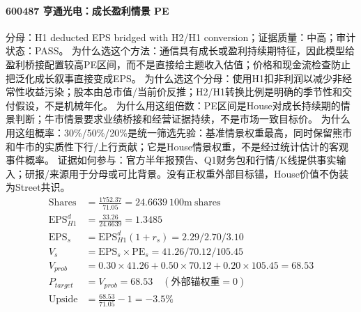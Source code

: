 \paragraph{600487 亨通光电：成长盈利情景 PE}
分母：H1 deducted EPS bridged with H2/H1 conversion；证据质量：中高；审计状态：PASS。
为什么选这个方法：通信具有成长或盈利持续期特征，因此模型给盈利桥接配置较高PE区间，而不是直接给主题收入估值；价格和现金流检查防止把泛化成长叙事直接变成EPS。
为什么选这个分母：使用H1扣非利润以减少非经常性收益污染；股本由总市值/当前价反推；H2/H1转换比例是明确的季节性和交付假设，不是机械年化。
为什么用这组倍数：PE区间是House对成长持续期的情景判断；牛市情景要求业绩桥接和经营证据持续，不是市场一致目标价。
为什么用这组概率：30\%/50\%/20\%是统一筛选先验：基准情景权重最高，同时保留熊市和牛市的实质性下行/上行贡献；它是House情景权重，不是经过统计估计的客观事件概率。
证据如何参与：官方半年报预告、Q1财务包和行情/K线提供事实输入；研报/来源用于分母或可比背景。没有正权重外部目标锚，House价值不伪装为Street共识。
\begin{align*}
\mathrm{Shares} &= \frac{1752.37}{71.05}=24.6639\ \mathrm{100m\ shares}\\
\mathrm{EPS}_{H1}^d &= \frac{33.26}{24.6639}=1.3485\\
\mathrm{EPS}_s &= \mathrm{EPS}_{H1}^d(1+r_s)=2.29/2.70/3.10\\
V_s &= \mathrm{EPS}_s\times \mathrm{PE}_s=41.26/70.12/105.45\\
V_{prob} &= 0.30\times 41.26+0.50\times 70.12+0.20\times 105.45=68.53\\
P_{target} &= V_{prob}=68.53\quad(\text{外部锚权重}=0)\\
\mathrm{Upside} &= \frac{68.53}{71.05}-1=-3.5\%\\
\end{align*}

